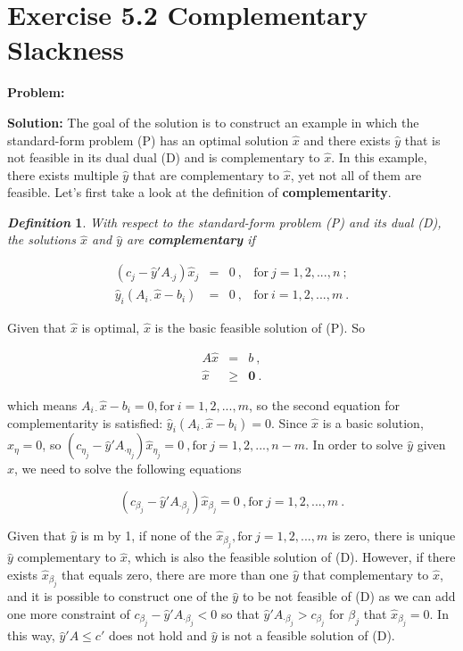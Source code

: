 \section{Exercise 5.2 Complementary Slackness}
\textbf{Problem:} 

\textbf{Solution:} The goal of the solution is to construct an example in which the standard-form problem (P) has an optimal solution $\hat{x}$ and there exists $\hat{y}$ that is not feasible in its dual dual (D) and is complementary to $\hat{x}$. In this example, there exists multiple $\hat{y}$ that are complementary to $\hat{x}$, yet not all of them are feasible.  Let's first take a look at the definition of \textbf{complementarity}.

\newtheorem{mydef}{\emph{\textbf{Definition}}}
\begin{mydef}
With respect to the standard-form problem (P) and its dual (D), the solutions $\hat{x}$ and $\hat{y}$ are \textbf{complementary} if 

\[
\begin{array}{rccl}
 (c_j-\hat{y}'A_{\cdot j})\hat{x}_j &  = & 0~,& \text{for}~j=1,2,...,n ~; \\
 \hat{y}_i(A_{i\cdot}\hat{x}-b_i) & = & 0~, & \text{for}~i=1,2,...,m ~.
\end{array}
\]

\end{mydef}

Given that $\hat{x}$ is optimal, $\hat{x}$ is the basic feasible solution of (P). So

\[
\begin{array}{rcl}
 A\hat{x} &=& b~, \\
 \hat{x} &\geq& \mathbf{0}~.
\end{array}
\]

which means $A_{i\cdot}\hat{x}-b_i = 0,\text{for}~i=1,2,...,m$, so the second equation for complementarity is satisfied: $\hat{y}_i(A_{i\cdot}\hat{x}-b_i) = 0$. Since $\hat{x}$ is a basic solution, $\hat{x}_{\eta} = 0$, so $(c_{\eta_j}-\hat{y}'A_{\cdot \eta_j})\hat{x}_{\eta_j} = 0~, \text{for}~j=1,2,...,n-m$. In order to solve $\hat{y}$ given $\hat{x}$, we need to solve the following equations

$$(c_{\beta_j}-\hat{y}'A_{\cdot \beta_j})\hat{x}_{\beta_j} = 0~, \text{for}~j=1,2,...,m~.$$

Given that $\hat{y}$ is m by 1, if none of the $\hat{x}_{\beta_j}, \text{for}~j=1,2,...,m$ is zero, there is unique $\hat{y}$ complementary to $\hat{x}$, which is also the feasible solution of (D). However, if there exists $\hat{x}_{\beta_j}$ that equals zero, there are more than one $\hat{y}$ that complementary to $\hat{x}$, and it is possible to construct one of the $\hat{y}$ to be not feasible of (D) as we can add one more constraint of $c_{\beta_j}-\hat{y}'A_{\cdot \beta_j} < 0$ so that $\hat{y}'A_{\cdot \beta_j} > c_{\beta_j}$ for $\beta_j$ that $\hat{x}_{\beta_j} = 0$. In this way, $\hat{y}'A \leq c'$ does not hold and $\hat{y}$ is not a feasible solution of (D).

